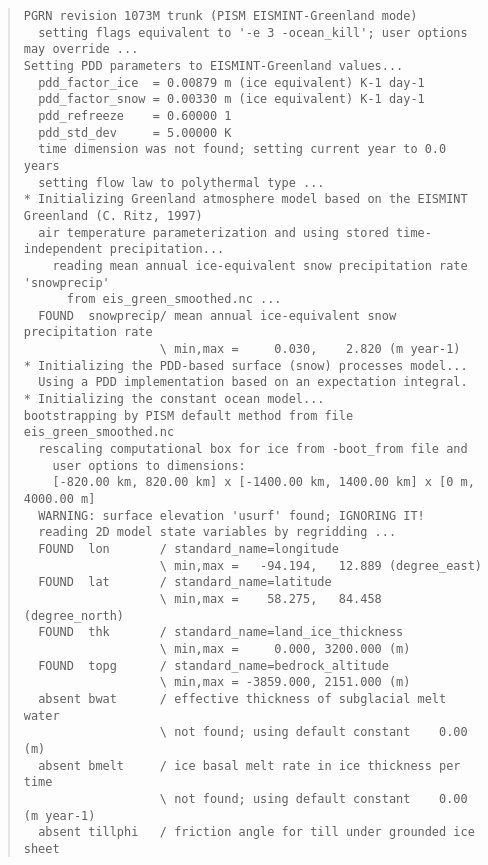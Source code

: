 \begin{table}
\centering
\scriptsize
\begin{quote}
\begin{verbatim}
PGRN revision 1073M trunk (PISM EISMINT-Greenland mode)
  setting flags equivalent to '-e 3 -ocean_kill'; user options may override ...
Setting PDD parameters to EISMINT-Greenland values...
  pdd_factor_ice  = 0.00879 m (ice equivalent) K-1 day-1
  pdd_factor_snow = 0.00330 m (ice equivalent) K-1 day-1
  pdd_refreeze    = 0.60000 1
  pdd_std_dev     = 5.00000 K
  time dimension was not found; setting current year to 0.0 years
  setting flow law to polythermal type ...
* Initializing Greenland atmosphere model based on the EISMINT Greenland (C. Ritz, 1997)
  air temperature parameterization and using stored time-independent precipitation...
    reading mean annual ice-equivalent snow precipitation rate 'snowprecip'
      from eis_green_smoothed.nc ... 
  FOUND  snowprecip/ mean annual ice-equivalent snow precipitation rate          
                   \ min,max =     0.030,    2.820 (m year-1)
* Initializing the PDD-based surface (snow) processes model...
  Using a PDD implementation based on an expectation integral.
* Initializing the constant ocean model...
bootstrapping by PISM default method from file eis_green_smoothed.nc
  rescaling computational box for ice from -boot_from file and
    user options to dimensions:
    [-820.00 km, 820.00 km] x [-1400.00 km, 1400.00 km] x [0 m, 4000.00 m]
  WARNING: surface elevation 'usurf' found; IGNORING IT!
  reading 2D model state variables by regridding ...
  FOUND  lon       / standard_name=longitude                                                   
                   \ min,max =   -94.194,   12.889 (degree_east)
  FOUND  lat       / standard_name=latitude                                                    
                   \ min,max =    58.275,   84.458 (degree_north)
  FOUND  thk       / standard_name=land_ice_thickness                                          
                   \ min,max =     0.000, 3200.000 (m)
  FOUND  topg      / standard_name=bedrock_altitude                                            
                   \ min,max = -3859.000, 2151.000 (m)
  absent bwat      / effective thickness of subglacial melt water                
                   \ not found; using default constant    0.00 (m)
  absent bmelt     / ice basal melt rate in ice thickness per time               
                   \ not found; using default constant    0.00 (m year-1)
  absent tillphi   / friction angle for till under grounded ice sheet            

\end{verbatim}
\end{quote}
\end{table}
